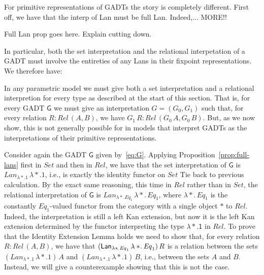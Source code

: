 \documentclass[acmsmall,screen,review,anonymous]{acmart}
\theoremstyle{definition}
\begin{document}
For primitive representations of GADTs the story is completely
different. First off, we have that {\color{blue} the interp of Lan
  must be full Lan}. Indeed,... {\color{blue} MORE!!}
\begin{proposition}\label{prop:full-lans}
Full Lan prop goes here. Explain cutting down.
\end{proposition}
\noindent
In particular, both the set interpretation and the relational
interpetation of a GADT must involve the entireties of any Lans in
their fixpoint representations. We therefore have:

\begin{example}
In any parametric model we must give both a set interpretation and a
relational interpretion for every type as described at the start of
this section. That is, for every GADT $\mathsf{G}$ we must give an
interpretation $G = (G_0,G_1)$ such that, for every relation $R :
\mathit{Rel}\,(A, B)$, we have $G_1\,R : \mathit{Rel}\,(G_0\,A,
G_0\,B)$. But, as we now show, this is not generally possible for in
models that interpret GADTs as the interpretations of their primitive
representations.

Consider again the GADT $\mathsf{G}$ given by~\eqref{eq:G}.  Applying
Proposition~\ref{prop:full-lans} first in $\mathit{Set}$ and then in
$\mathit{Rel}$, we have that the set interpretation of $\mathsf{G}$ is
$\mathit{Lan}_{\lambda *.1}\,\lambda *.1$, i.e., is exactly the
identity functor on $\mathit{Set}$ {\color{blue} Tie back to previous
  calculation}. By the exact same reasoning, this time in
$\mathit{Rel}$ rather than in $\mathit{Set}$, the relational
interpretation of $\mathsf{G}$ is $\mathit{Lan}_{\lambda
  *.\mathit{Eq}_1} \,\lambda *\!.\,\mathit{Eq}_1$, where $\lambda
*\!.\,\mathit{Eq}_1$ is the constantly $\mathit{Eq}_1$-valued functor
from the category with a single object $*$ to $\mathit{Rel}$.  Indeed,
the interpretation is still a left Kan extension, but now it is the
left Kan extension determined by the functor interpreting the type
$\mathsf{\lambda *. 1}$ in $\mathit{Rel}$. To prove that the Identity
Extension Lemma holds we need to show that, for every relation $R :
\mathit{Rel}\,(A, B)$, we have that $(\mathit{\mathsf{Lan}}_{\lambda
  *\!.\,\mathit{Eq}_1} \,\lambda *\!.\,\mathit{Eq}_1)\, R$ is a
relation between the sets $(\mathit{Lan}_{\lambda *. 1}\,\lambda
*\!. 1)\, A$ and $(\mathit{Lan}_{\lambda *. 1}\,\lambda *\!. 1)\,B$,
i.e., between the sets $A$ and $B$.  Instead, we will give a
counterexample showing that this is not the case.


\end{example}
\end{document}
